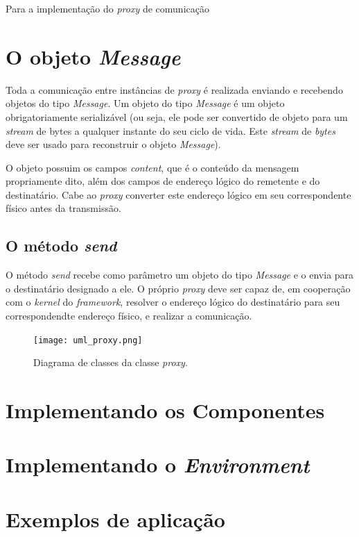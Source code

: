 Para a implementação do \textit{proxy} de comunicação 

\section{O objeto \emph{Message}}

Toda a comunicação entre instâncias de \textit{proxy} é realizada enviando e recebendo objetos do tipo \textit{Message}. Um objeto do tipo \textit{Message} é um objeto obrigatoriamente serializável (ou seja, ele pode ser convertido de objeto para um \textit{stream} de bytes a qualquer instante do seu ciclo de vida. Este \textit{stream} de \textit{bytes} deve ser usado para reconstruir o objeto \textit{Message}).

O objeto possuim os campos \textit{content}, que é o conteúdo da mensagem propriamente dito, além dos campos de endereço lógico do remetente e do destinatário. Cabe ao \textit{proxy} converter este endereço lógico em seu correspondente físico antes da transmissão.

\subsection{O método \emph{send}}

O método \textit{send} recebe como parâmetro um objeto do tipo \textit{Message} e o envia para o destinatário designado a ele. O próprio \textit{proxy} deve ser capaz de, em cooperação com o \textit{kernel} do \textit{framework}, resolver o endereço lógico do destinatário para seu correspondendte endereço físico, e realizar a comunicação.


\begin{figure}
  \centerline{\texttt{[image: uml\_proxy.png]}}
  \caption{Diagrama de classes da classe \textit{proxy}.}
\label{fig:uml_proxy_basico}
\end{figure}

\section{Implementando os Componentes \label{implement_components}}
\section{Implementando o \emph{Environment}}
\section{Exemplos de aplicação}


